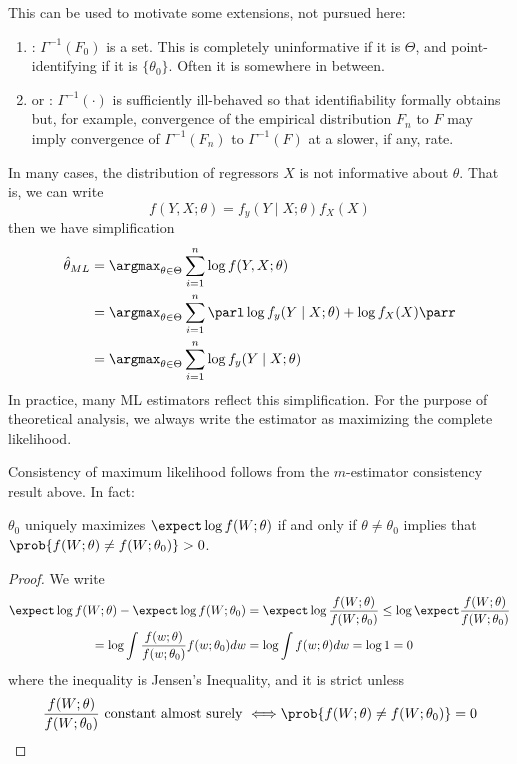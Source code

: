 \documentclass[10pt]{article}
\begin{document}
\begin{remark}
	This can be used to motivate some extensions, not pursued here:
	\begin{enumerate}
		\item {}: $\Gamma^{-1}(F_0)$ is a set. This is completely uninformative if it is $\Theta$, and point-identifying if it is $\{\theta_0\}$. Often it is somewhere in between.
		\item {} or : $\Gamma^{-1}(\cdot)$ is sufficiently ill-behaved so that identifiability formally obtains but, for example, convergence of the empirical distribution $F_n$ to $F$ may imply convergence of $\Gamma^{-1}(F_n)$ to $\Gamma^{-1}(F)$ at a slower, if any, rate.
	\end{enumerate}
\end{remark}
\begin{remark}
	In many cases, the distribution of regressors $X$ is not informative about $\theta$. That is, we can write \[f(Y,X;\theta) = f_y(Y\mid X;\theta) f_X(X)\]then we have simplification 
	\begin{align*}
		\hat{\theta}_{ML} &= \argmax_{\theta\in\Theta} \sum_{i=1}^n \log f(Y,X;\theta) \\ &= \argmax_{\theta\in\Theta} \sum_{i=1}^n \parl \log f_y(Y\mid X;\theta) + \log f_X(X)\parr \\
		&= \argmax_{\theta\in\Theta} \sum_{i=1}^n \log f_y(Y \mid X;\theta)
	\end{align*}
	In practice, many ML estimators reflect this simplification. For the purpose of theoretical analysis, we always write the estimator as maximizing the complete likelihood.
\end{remark}

Consistency of maximum likelihood follows from the $m$-estimator consistency result above. In fact:

\begin{theorem}
	$\theta_0$ uniquely maximizes $\expect \log f(W;\theta)$ if and only if $\theta \ne \theta_0$ implies that $\prob\{f(W;\theta) \ne f(W;\theta_0)\} > 0$.
\end{theorem}
\begin{proof}
	We write
	\begin{align*}
		\expect \log f(W;\theta) - \expect \log f(W;\theta_0) &= \expect \log \frac{f(W;\theta)}{f(W;\theta_0)} \le \log \expect \frac{f(W;\theta)}{f(W;\theta_0)} \\
		= \log \int \frac{f(w;\theta)}{f(w;\theta_0)} f(w;\theta_0)dw &= \log \int f(w;\theta) dw = \log 1 = 0
	\end{align*}
	where the inequality is Jensen's Inequality, and it is strict unless \[\frac{f(W;\theta)}{f(W;\theta_0)} \text{ constant almost surely } \Longleftrightarrow \prob\{f(W;\theta) \ne f(W;\theta_0)\} = 0\]
\end{proof}
\end{document}
